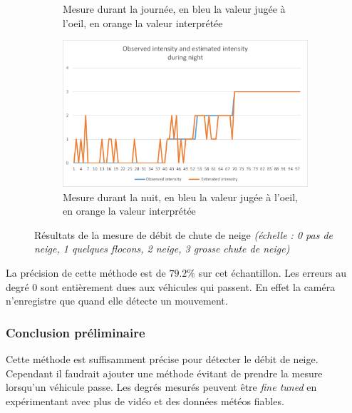 \begin{figure}[H]
\begin{subfigure}{.45\textwidth}
        \caption{Mesure durant la journée, en bleu la valeur jugée à l'oeil, en orange la valeur interprétée}
        \label{fig:Snowfall_dayResults}
    \end{subfigure}
    \hfill
    \begin{subfigure}{.45\textwidth}
        \includegraphics[width=\linewidth]{Images/computer_vision/snowfall/nightResults.png}
        \caption{Mesure durant la nuit, en bleu la valeur jugée à l'oeil, en orange la valeur interprétée}
        \label{fig:Snowfall_nightResults}
    \end{subfigure}
    \caption{Résultats de la mesure de débit de chute de neige \emph{(échelle : 0 pas de neige, 1 quelques flocons, 2 neige, 3 grosse chute de neige)}}
    \label{fig:Snowfall_results}
\end{figure}

\noindent
La précision de cette méthode est de $79.2\%$ sur cet échantillon. Les erreurs au degré 0 sont entièrement dues aux véhicules qui passent.
En effet la caméra n'enregistre que quand elle détecte un mouvement.

\subsubsection{Conclusion préliminaire}
Cette méthode est suffisamment précise pour détecter le débit de neige. Cependant il faudrait
ajouter une méthode évitant de prendre la mesure lorsqu'un véhicule passe.
Les degrés mesurés peuvent être \emph{fine tuned} en expérimentant avec plus de vidéo et des données météos fiables.


